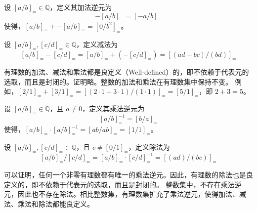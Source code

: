 \begin{definition}
    设 $[a/b]_{=}\in\mathbb{Q}$，定义其加法逆元为
    \[
        -[a/b]_{=} = [-a/b]_{=}
    \]
    使得，$[a/b]_{=} + -[a/b]_{=} = [0/b^2]_{=}$。
\end{definition}

\begin{definition}
    设 $[a/b]_{=},[c/d]_{=}\in\mathbb{Q}$，定义减法为
    \[
        [a/b]_{=} - [c/d]_{=} = [a/b]_{=} + (-[c/d]_{=}) = [(ad-bc)/(bd)]_{=}
    \]
\end{definition}

\vspace{1em}

\begin{note}
    有理数的加法、减法和乘法都是良定义（Well-defined）的，即不依赖于代表元的选取，而且是封闭的。证明略。整数的加法和乘法在有理数集中保持不变。
    例如，$[2/1]_{=} + [3/1]_{=} = [(2\cdot1+3\cdot1)/(1\cdot1)]_{=} = [5/1]_{=}$，即 $2+3=5$。
\end{note}

\vspace{1em}

\begin{definition}
    设 $[a/b]_{=}\in\mathbb{Q}$，且 $a\neq 0$，定义其乘法逆元为
    \[
        [a/b]_{=}^{-1} = [b/a]_{=}
    \]
    使得，$[a/b]_{=} \cdot [a/b]_{=}^{-1} = [ab/ab]_{=} = [1/1]_{=}$。
\end{definition}

\begin{definition}
    设 $[a/b]_{=},[c/d]_{=}\in\mathbb{Q}$，且 $c\neq [0/1]_{=}$，定义除法为
    \[
        [a/b]_{=} / [c/d]_{=} = [a/b]_{=} \cdot [c/d]_{=}^{-1} = [(ad)/(bc)]_{=}
    \]
\end{definition}
\vspace{1em}

\begin{note}
    可以证明，任何一个非零有理数都有唯一的乘法逆元。因此，有理数的除法也是良定义的，即不依赖于代表元的选取，而且是封闭的。
    整数集中，不存在乘法逆元，因此也不存在除法。相比整数集，有理数集扩充了乘法逆元，使得加法、减法、乘法和除法都能良定义。
\end{note}

